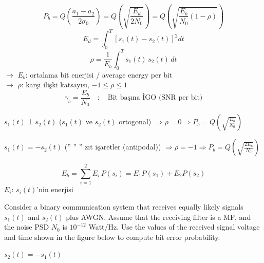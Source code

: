 \documentclass[11pt,a4paper]{article}
\begin{document}

\begin{center}
\end{center}

\[
P_b = Q\!\left(\frac{a_1-a_2}{2\sigma_0}\right) = Q\!\left(\sqrt{\frac{E_d}{2N_0}}\right) = Q\!\left(\sqrt{\frac{E_b}{N_0}(1-\rho)}\right)
\]
\[ E_d = \int_0^T \left[s_1(t)-s_2(t)\right]^2 dt \]
\[ \rho = \frac{1}{E_b}\int_0^T s_1(t)\,s_2(t)\,dt \]
\noindent $\rightarrow$ $E_b$: ortalama bit enerjisi / average energy per bit \\
$\rightarrow$ $\rho$: karşı ilişki katsayısı, $-1\le\rho\le1$
\[ \gamma_b = \frac{E_b}{N_0} \quad : \quad \text{Bit başına İGO (SNR per bit)} \]

\noindent $s_1(t)\perp s_2(t)$ ($s_1(t)$ ve $s_2(t)$ ortogonal) $\Rightarrow \rho=0 \Rightarrow P_b = Q\!\left(\sqrt{\tfrac{E_b}{N_0}}\right)$

\noindent $s_1(t) = -s_2(t)$ ('' '' '' zıt işaretler (antipodal)) $\Rightarrow \rho=-1 \Rightarrow P_b = Q\!\left(\sqrt{\tfrac{2E_b}{N_0}}\right)$

\[ E_b = \sum_{i=1}^{2} E_i\,P(s_i) = E_1 P(s_1) + E_2 P(s_2) \]
\noindent $E_i$: $s_i(t)$'nin enerjisi

\begin{ornek}
Consider a binary communication system that receives equally likely signals $s_1(t)$ and $s_2(t)$ plus AWGN. Assume that the receiving filter is a MF, and the noise PSD $N_0$ is $10^{-12}$ Watt/Hz. Use the values of the received signal voltage and time shown in the figure below to compute bit error probability.

\begin{center}
\qquad $s_2(t) = -s_1(t)$
\end{center}
\end{ornek}
\end{document}
